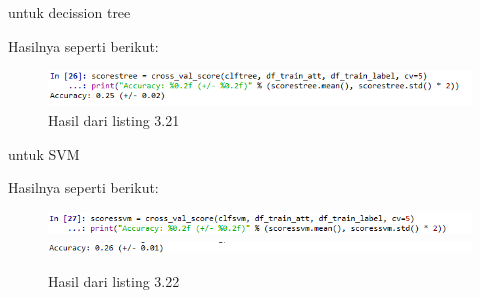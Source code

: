 untuk decission tree

Hasilnya seperti berikut:
\begin{figure}[H]
	\centering
	\includegraphics[width=12cm]{figures/1174075/3/30.png}
	\caption{Hasil dari listing 3.21}
\end{figure}

untuk SVM

Hasilnya seperti berikut:
\begin{figure}[H]
	\centering
	\includegraphics[width=12cm]{figures/1174075/3/31.png}
	\includegraphics{figures/1174075/3/31a.png}
	\caption{Hasil dari listing 3.22}
\end{figure}

